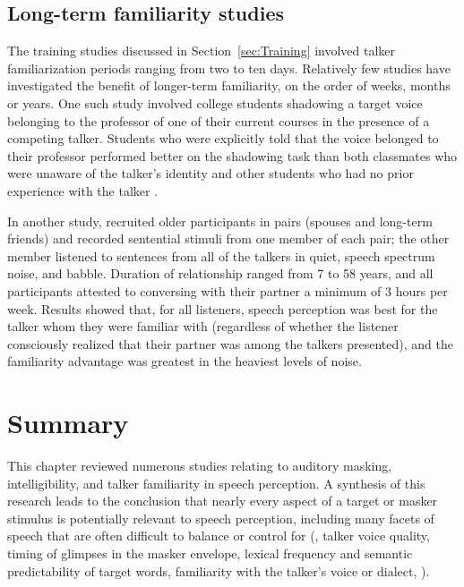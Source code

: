 \subsection{Long-term familiarity studies\label{sec:LongTerm}}
The training studies discussed in Section~\ref{sec:Training} involved talker familiarization periods ranging from two to ten days.  Relatively few studies have investigated the benefit of longer-term familiarity, on the order of weeks, months or years.  One such study involved college students shadowing a target voice belonging to the professor of one of their current courses in the presence of a competing talker.  Students who were explicitly told that the voice belonged to their professor performed better on the shadowing task than both classmates who were unaware of the talker’s identity and other students who had no prior experience with the talker \citep{NewmanEvers2007}.  

In another study, \citet{SouzaEtAl2013} recruited older participants in pairs (spouses and long-term friends) and recorded sentential stimuli from one member of each pair; the other member listened to sentences from all of the talkers in quiet, speech spectrum noise, and babble.  Duration of relationship ranged from 7 to 58 years, and all participants attested to conversing with their partner a minimum of 3 hours per week.  Results showed that, for all listeners, speech perception was best for the talker whom they were familiar with (regardless of whether the listener consciously realized that their partner was among the talkers presented), and the familiarity advantage was greatest in the heaviest levels of noise.


\section[Summary]{Summary\label{sec:Summary}}
This chapter reviewed numerous studies relating to auditory masking, intelligibility, and talker familiarity in speech perception.  A synthesis of this research leads to the conclusion that nearly every aspect of a target or masker stimulus is potentially relevant to speech perception, including many facets of speech that are often difficult to balance or control for (\eg, talker voice quality, timing of glimpses in the masker envelope, lexical frequency and semantic predictability of target words, familiarity with the talker’s voice or dialect, \etc).  %
